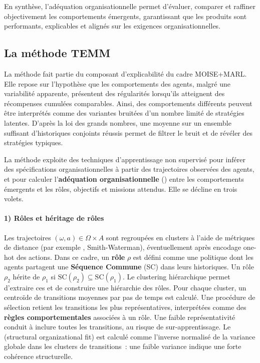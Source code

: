 En synthèse, l'adéquation organisationnelle permet d'évaluer, comparer et raffiner objectivement les comportements émergents, garantissant que les  produits sont performants, explicables et alignés sur les exigences organisationnelles.

\subsection{La méthode TEMM}
\label{sec:TEMM_algorithm}

La méthode  fait partie du composant d'explicabilité du cadre MOISE+MARL. Elle repose sur l'hypothèse que les comportements des agents, malgré une variabilité apparente, présentent des régularités lorsqu'ils atteignent des récompenses cumulées comparables. Ainsi, des comportements différents peuvent être interprétés comme des variantes bruitées d'un nombre limité de stratégies latentes. D'après la loi des grands nombres, une moyenne sur un ensemble suffisant d'historiques conjoints réussis permet de filtrer le bruit et de révéler des stratégies typiques.

La méthode exploite des techniques d'apprentissage non supervisé pour inférer des spécifications organisationnelles à partir des trajectoires observées des agents, et pour calculer l'\textbf{adéquation organisationnelle} () entre les comportements émergents et les rôles, objectifs et missions attendus. Elle se décline en trois volets.

\paragraph{1) Rôles et héritage de rôles}
Les trajectoires $(\omega, a) \in \Omega \times A$ sont regroupées en clusters à l'aide de métriques de distance (par exemple , Smith-Waterman), éventuellement après encodage one-hot des actions.
Dans ce cadre, un \textbf{rôle} $\rho$ est défini comme une politique dont les agents partagent une \textbf{Séquence Commune} (SC) dans leurs historiques.
Un rôle $\rho_2$ hérite de $\rho_1$ si $\text{SC}(\rho_2) \subseteq \text{SC}(\rho_1)$.
Le clustering hiérarchique permet d'extraire ces  et de construire une hiérarchie des rôles.
Pour chaque cluster, un centroïde de transitions moyennes par pas de temps est calculé. Une procédure de sélection retient les transitions les plus représentatives, interprétées comme des \textbf{règles comportementales} associées à un rôle.
Une faible représentativité conduit à inclure toutes les transitions, au risque de sur-apprentissage.
Le \textbf{} (structural organizational fit) est calculé comme l'inverse normalisé de la variance globale dans les clusters de transitions~: une faible variance indique une forte cohérence structurelle.

